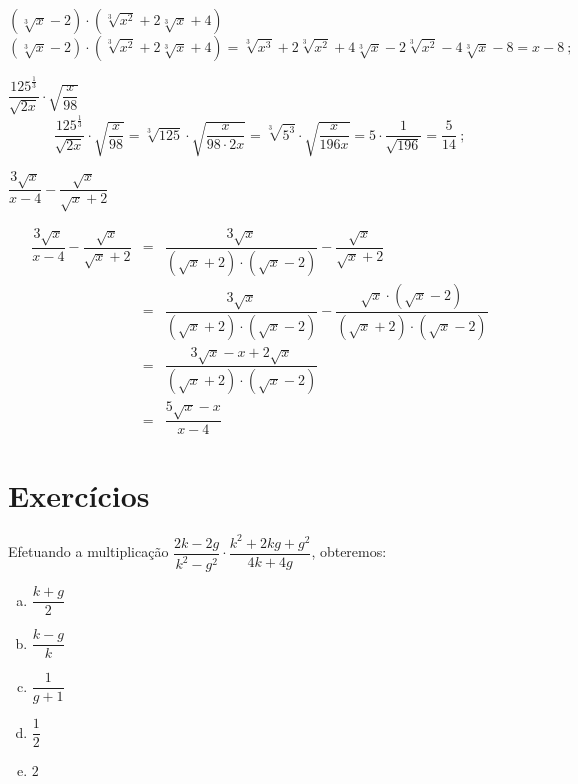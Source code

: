  \begin{exem}
  $(\sqrt[3]{x} - 2) \cdot (\sqrt[3]{x^2} + 2 \sqrt[3]{x} + 4)$
\begin{equation}
(\sqrt[3]{x} - 2) \cdot (\sqrt[3]{x^2} + 2 \sqrt[3]{x} + 4)= \sqrt[3]{x^3} + 2\sqrt[3]{x^2} + 4 \sqrt[3]{x} - 2\sqrt[3]{x^2}- 4 \sqrt[3]{x} - 8= x - 8 \ ;
\end{equation}
   \end{exem}
 
 \begin{exem}
  $\dfrac{125^{\frac{1}{3}}}{\sqrt{2x}} \cdot \sqrt{\dfrac{x}{98}}$
\begin{equation}
\dfrac{125^{\frac{1}{3}}}{\sqrt{2x}} \cdot \sqrt{\dfrac{x}{98}}= \sqrt[3]{125} \cdot \sqrt{\dfrac{x}{98 \cdot 2x}}= \sqrt[3]{5^3} \cdot \sqrt{\dfrac{x}{196x}}= 5 \cdot \dfrac{1}{\sqrt{196}}= \dfrac{5}{14} \ ;
\end{equation}
   \end{exem}
 
 \begin{exem}
   $\dfrac{3\sqrt{x}}{x-4} - \dfrac{\sqrt{x}}{\sqrt{x}+2}$
   
   \begin{eqnarray*}
    \dfrac{3\sqrt{x}}{x-4} - \dfrac{\sqrt{x}}{\sqrt{x}+2} &=& \dfrac{3\sqrt{x}}{(\sqrt{x}+2) \cdot (\sqrt{x}-2)} - \dfrac{\sqrt{x}}{\sqrt{x}+2} \\
    &=& \dfrac{3\sqrt{x}}{(\sqrt{x}+2) \cdot (\sqrt{x}-2)} - \dfrac{\sqrt{x} \cdot (\sqrt{x}-2)}{(\sqrt{x}+2) \cdot (\sqrt{x}-2)} \\
    &=& \dfrac{3\sqrt{x} - x + 2\sqrt{x}}{(\sqrt{x}+2) \cdot (\sqrt{x}-2)} \\
    &=& \dfrac{5\sqrt{x} - x}{x-4}
   \end{eqnarray*}

 \end{exem}
 
 \section{Exercícios}
 
 \begin{exer}
 Efetuando a multiplicação $\dfrac{2k-2g}{k^2-g^2} \cdot \dfrac{k^2+2kg+g^2}{4k + 4g}$, obteremos:

\begin{enumerate}[a)]
\item $\dfrac{k+g}{2}$
\item $\dfrac{k-g}{k}$
\item $\dfrac{1}{g+1}$
\item $\dfrac{1}{2}$
\item $2$
\end{enumerate}
\end{exer}

